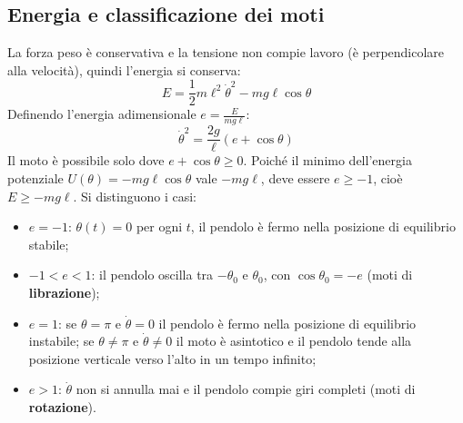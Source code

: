 \documentclass[11pt, a4paper, openright]{book}
\theoremstyle{plain}
\theoremstyle{definition}
\theoremstyle{remark}
\begin{document}
\subsection{Energia e classificazione dei moti}
La forza peso è conservativa e la tensione non compie lavoro (è perpendicolare alla velocità), quindi l'energia si conserva:
\begin{equation}
    E = \frac{1}{2}m\ell^2\dot{\theta}^2 - mg\ell\cos\theta
\end{equation}
Definendo l'energia adimensionale $e = \frac{E}{mg\ell}$:
\begin{equation}
    \dot{\theta}^2 = \frac{2g}{\ell}\left(e + \cos\theta\right)
\end{equation}
Il moto è possibile solo dove $e + \cos\theta \geq 0$. Poiché il minimo dell'energia potenziale $U(\theta) = -mg\ell\cos\theta$ vale $-mg\ell$, deve essere $e \geq -1$, cioè $E \geq -mg\ell$. Si distinguono i casi:
\begin{itemize}
    \item $e = -1$: $\theta(t) = 0$ per ogni $t$, il pendolo è fermo nella posizione di equilibrio stabile;
    \item $-1 < e < 1$: il pendolo oscilla tra $-\theta_0$ e $\theta_0$, con $\cos\theta_0 = -e$ (moti di \textbf{librazione});
    \item $e = 1$: se $\theta = \pi$ e $\dot{\theta} = 0$ il pendolo è fermo nella posizione di equilibrio instabile; se $\theta \neq \pi$ e $\dot{\theta} \neq 0$ il moto è asintotico e il pendolo tende alla posizione verticale verso l'alto in un tempo infinito;
    \item $e > 1$: $\dot{\theta}$ non si annulla mai e il pendolo compie giri completi (moti di \textbf{rotazione}).
\end{itemize}
\end{document}
